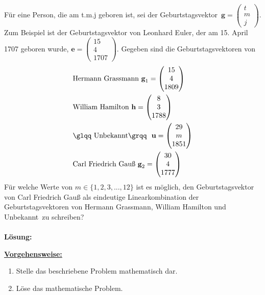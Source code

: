 \subsection*{}
Für eine Person, die am t.m.j geboren ist, sei der \glqq Geburtstagsvektor\grqq \ $ \textbf{g} = 
\begin{pmatrix}
t \\ m \\ j
\end{pmatrix}
$.
Zum Beispiel ist der Geburtstagsvektor von Leonhard Euler, der am 15. April 1707 geboren wurde, $ \textbf{e}
=
\begin{pmatrix}
15 \\ 4 \\ 1707
\end{pmatrix}
$.
Gegeben sind die Geburtstagsvektoren von
\begin{align*}
&\textrm{Hermann Grassmann } 
\textbf{g}_1 =
\begin{pmatrix}
15 \\ 4 \\ 1809
\end{pmatrix}\\
&\textrm{William Hamilton } 
\textbf{h} =
\begin{pmatrix}
8 \\ 3 \\ 1788
\end{pmatrix}\\
&\textrm{\glqq Unbekannt\grqq \ } 
\textbf{u} =
\begin{pmatrix}
29 \\ m \\ 1851
\end{pmatrix}\\
&\textrm{Carl Friedrich Gauß } 
\textbf{g}_2 =
\begin{pmatrix}
30 \\ 4 \\ 1777
\end{pmatrix}
\end{align*} 
Für welche Werte von $ m \in \{1,2,3,...,12 \} $ ist es möglich, den Geburtstagsvektor von Carl Friedrich Gauß als eindeutige Linearkombination der Geburtstagsvektoren von Hermann Grassmann, William Hamilton und \glqq Unbekannt\grqq \ zu schreiben?
\\ \\
\textbf{Lösung:}
\begin{mdframed}
\underline{\textbf{Vorgehensweise:}}
\begin{enumerate}
\item Stelle das beschriebene Problem mathematisch dar.
\item Löse das mathematische Problem.
\end{enumerate}
\end{mdframed}

